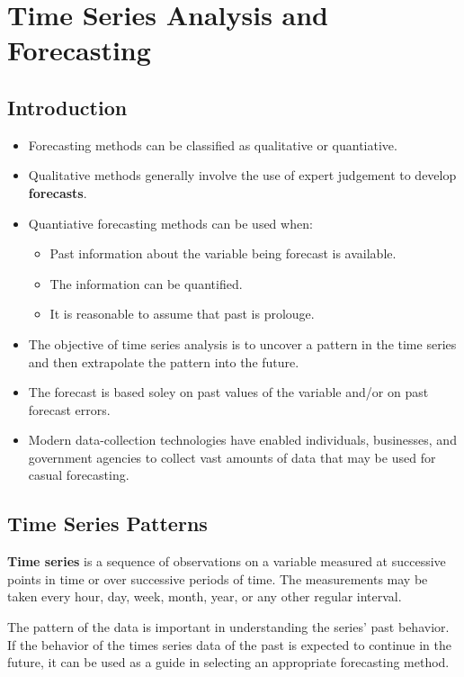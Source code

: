 \documentclass{report}
\begin{document}
\chapter{Time Series Analysis and Forecasting}
\section{Introduction}
\begin{itemize}
  \item Forecasting methods can be classified as qualitative or quantiative.
  \item Qualitative methods generally involve the use of expert judgement to develop \textbf{forecasts}.
  \item Quantiative forecasting methods can be used when:
    \begin{itemize}[label=$\circ$]
      \item Past information about the variable being forecast is available.
      \item The information can be quantified.
      \item It is reasonable to assume that past is prolouge.
    \end{itemize}
  \item The objective of time series analysis is to uncover a pattern in the time series and then extrapolate the pattern into the future.
  \item The forecast is based soley on past values of the variable and/or on past forecast  errors.
  \item Modern data-collection technologies have enabled individuals, businesses, and government agencies to collect vast amounts of data that may be used for casual forecasting.
\end{itemize}
\section{Time Series Patterns}
\textbf{Time series} is a sequence of observations on a variable measured at successive points in time or over successive periods of time.
\bigbreak \noindent
The measurements may be taken every hour, day, week, month, year, or any other regular interval. \vspace{1.5mm}

\noindent The pattern of the data is important in understanding the series' past behavior.
\bigbreak \noindent
If the behavior of the times series data of the past is expected to continue in the future, it can be used as a guide in selecting an appropriate forecasting method.
\end{document}
